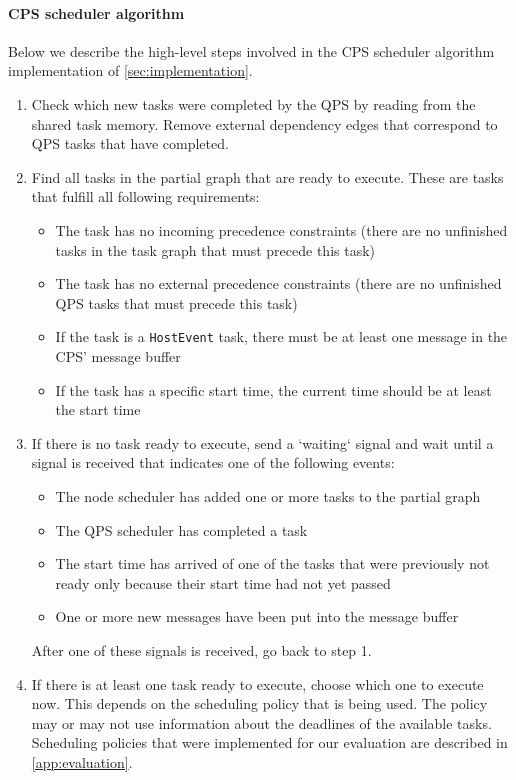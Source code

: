 \paragraph{CPS scheduler algorithm}
Below we describe the high-level steps involved in the CPS scheduler algorithm implementation of \cref{sec:implementation}.
\begin{enumerate}
    \item Check which new tasks were completed by the QPS by reading from the shared task memory. Remove external dependency edges that correspond to QPS tasks that have completed.
    \item Find all tasks in the partial graph that are ready to execute. These are tasks that fulfill all following requirements:
        \begin{itemize}
            \item The task has no incoming precedence constraints (there are no unfinished tasks in the task graph that must precede this task)
            \item The task has no external precedence constraints (there are no unfinished QPS tasks that must precede this task)
            \item If the task is a \texttt{HostEvent} task, there must be at least one message in the CPS' message buffer
            \item If the task has a specific start time, the current time should be at least the start time
        \end{itemize}
    \item If there is no task ready to execute, send a `waiting` signal and wait until a signal is received that indicates one of the following events:
        \begin{itemize}
            \item The node scheduler has added one or more tasks to the partial graph
            \item The QPS scheduler has completed a task
            \item The start time has arrived of one of the tasks that were previously not ready only because their start time had not yet passed
            \item One or more new messages have been put into the message buffer
        \end{itemize}
        After one of these signals is received, go back to step 1.
    \item If there is at least one task ready to execute, choose which one to execute now. This depends on the scheduling policy that is being used. The policy may or may not use information about the deadlines of the available tasks. Scheduling policies that were implemented for our evaluation are described in \cref{app:evaluation}.

\end{enumerate}
